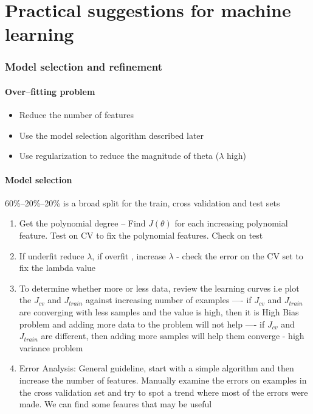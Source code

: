\documentclass[12pt,a4paper]{article}
\begin{document}
\part{Practical suggestions for machine learning}
\section{Model selection and refinement}

\subsection{Over--fitting problem}
\begin{itemize}
\item Reduce the number of features
\item Use the model selection algorithm described later
\item Use regularization to reduce the magnitude of theta ($\lambda$ high)
\end{itemize}

\subsection{Model selection}
60\%--20\%--20\% is a broad split for the train, cross validation and test sets

\begin{enumerate}
\item Get  the polynomial degree -- Find $J(\theta)$ for each increasing polynomial feature. Test on CV to fix the polynomial features. Check on test 
\item If underfit reduce $\lambda$, if overfit , increase $\lambda$ \-- check the error on the CV set to fix the lambda value
\item To determine whether more or less data,  review the learning curves i.e plot the $J_{cv}$ and $J_{train}$ against increasing number of examples
\subitem ---- if $J_{cv}$ and $J_{train}$ are converging with less samples and the value is high, then it is High Bias problem and adding more data to the problem will not help
\subitem ---- if $J_{cv}$ and $J_{train}$ are different, then adding more samples will help them converge \-- high variance problem
\item Error Analysis: General guideline, start with a simple algorithm and then increase the number of features. Manually examine the errors on examples in the cross validation set and try to spot a trend where most of the errors were made. We can find some feaures that may be useful
\end{enumerate}
\end{document}
